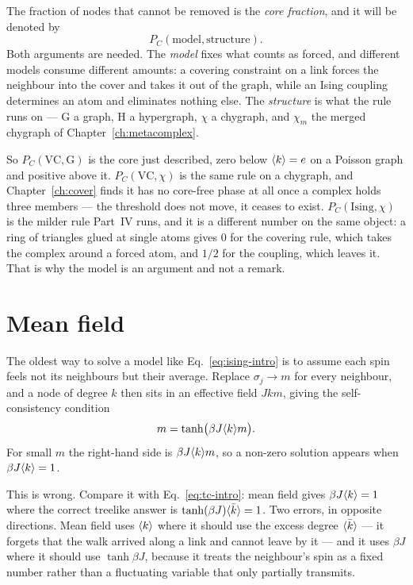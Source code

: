 The fraction of nodes that cannot be removed is the \emph{core fraction}, and
it will be denoted by
\[
  P_{C}(\text{model},\text{structure}).
\]
Both arguments are needed. The \emph{model} fixes what counts as forced, and different
models consume different amounts: a covering constraint on a link forces the
neighbour into the cover and takes it out of the graph, while an Ising coupling
determines an atom and eliminates nothing else. The \emph{structure} is what
the rule runs on --- $\mathrm{G}$ a graph, $\mathrm{H}$ a hypergraph, $\chi$ a
chygraph, and $\chi_{m}$ the merged chygraph of
Chapter~\ref{ch:metacomplex}.

So $P_{C}(\mathrm{VC},\mathrm{G})$ is the core just described, zero below
$\langle k \rangle=e$ on a Poisson graph and positive above it.
$P_{C}(\mathrm{VC},\chi)$ is the same rule on a chygraph, and
Chapter~\ref{ch:cover} finds it has no core-free phase at all once a complex
holds three members --- the threshold does not move, it ceases to exist.
$P_{C}(\mathrm{Ising},\chi)$ is the milder rule Part~IV runs, and it is a
different number on the same object: a ring of triangles glued at single atoms
gives $0$ for the covering rule, which takes the complex around a forced atom,
and $1/2$ for the coupling, which leaves it. That is why the model is an
argument and not a remark.

\section{Mean field}
\label{sec:meanfield}

The oldest way to solve a model like Eq.~\eqref{eq:ising-intro} is to assume
each spin feels not its neighbours but their average. Replace
$\sigma_{j}\to m$ for every neighbour, and a node of degree $k$ then sits in an
effective field $Jkm$, giving the self-consistency condition
\begin{equation}
  m=\tanh\bigl(\beta J\langle k \rangle m\bigr).
  \label{eq:mf}
\end{equation}
For small $m$ the right-hand side is $\beta J\langle k \rangle m$, so a non-zero solution
appears when $\beta J\langle k \rangle=1$.

This is wrong. Compare it with Eq.~\eqref{eq:tc-intro}: mean field gives $\beta J\langle k \rangle=1$ where the correct
treelike answer is $\tanh(\beta J)\langle \bar k \rangle=1$. Two errors, in opposite
directions. Mean field uses $\langle k \rangle$ where it should use the excess degree
$\langle \bar k \rangle$ --- it forgets that the walk arrived along a link and cannot
leave by it --- and it uses $\beta J$ where it should use $\tanh\beta J$,
because it treats the neighbour's spin as a fixed number rather than a
fluctuating variable that only partially transmits.

